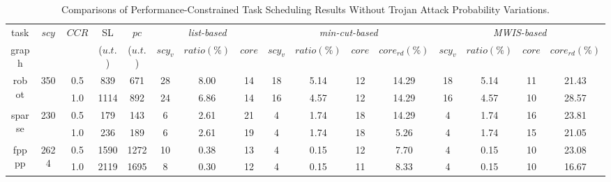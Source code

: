 \documentclass[10pt,journal]{IEEEtran}
\begin{document}
\begin{table}[!t]
\renewcommand{\arraystretch}{1.1}
\caption{Comparisons of Performance-Constrained Task Scheduling Results Without Trojan Attack Probability Variations.}
\centering
\begin{tabular}{c|c|c|c|c|c|c|c|c|c|c|c|c|c|c|c}
\hline
\hline
task                 &\multicolumn{1}{c|}{\multirow{2}{*}{$scy$}}                     &\multicolumn{1}{c|}{\multirow{2}{*}{$CCR$}}     &SL    & $pc$              &\multicolumn{3}{c|}{\textit{list-based}}        &\multicolumn{4}{c|}{\textit{min-cut-based}}    &\multicolumn{4}{|c}{\textit{MWIS-based}}    \\ \cline{6-8} \cline{9-12} \cline{13-16}
graph           &    &   &($u.t.$)   &($u.t.$)    &\multicolumn{1}{c|}{\multirow{1}{*}{$scy_v$}} &\hspace*{-0.4em}$ratio(\%)$\hspace*{-0.4em}    &$core$   &$scy_v$       &\hspace*{-0.4em}$ratio(\%)$\hspace*{-0.4em}  &$core$ &\hspace*{-0.4em}$core_{rd}(\%)$\hspace*{-0.4em}  &$scy_v$       &\hspace*{-0.4em}$ratio(\%)$\hspace*{-0.4em}   &$core$   &\hspace*{-0.4em}$core_{rd}(\%)$\hspace*{-0.4em} \\

\hline
\hline

\multicolumn{1}{c|}{\multirow{2}{*}{robot}}      &\multicolumn{1}{c|}{\multirow{2}{*}{350}} &0.5 &839 &671 &28   &8.00   &14  &18 &5.14  &12   &14.29  &18  &5.14  &11        &21.43 \\
                                              &                                &1.0  &1114  &892  &24 &6.86  &14  &16 &4.57    &12  &14.29  &16 &4.57  &10       &28.57     \\
\hline

\multicolumn{1}{c|}{\multirow{2}{*}{sparse}}    &\multicolumn{1}{c|}{\multirow{2}{*}{230}}  &0.5 &179 &143 &6  &2.61  &21  &4 &1.74  &18  &14.29  &4     &1.74 &16        &23.81 \\
&     &1.0 &236  &189  &6   &2.61   &19  &4 &1.74  &18   &5.26 &4   &1.74   &15      &21.05 \\

\hline

\multicolumn{1}{c|}{\multirow{2}{*}{fpppp}}     &\multicolumn{1}{c|}{\multirow{2}{*}{2624}}   &0.5 &1590  &1272  &10  &0.38 &13  &4 &0.15  &12 &7.70  &4   &0.15   &10        &23.08  \\
&   &1.0 &2119  &1695  &8   &0.30   &12  &4 &0.15 &11  &8.33  &4   &0.15  &10       &16.67  \\


\end{tabular}
\end{table}
\end{document}
